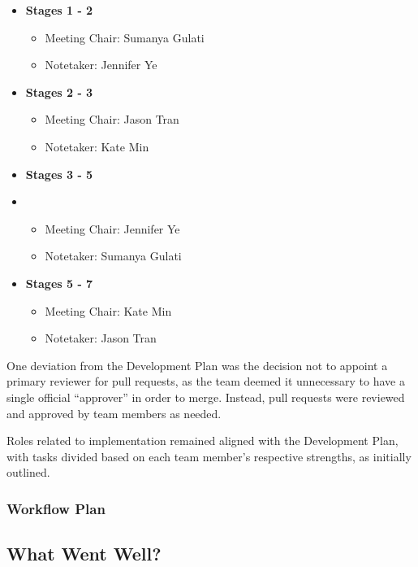 \documentclass{article}
\begin{document}
\begin{itemize}
    \item \textbf{Stages 1 - 2}
        \begin{itemize}
            \item Meeting Chair: Sumanya Gulati
            \item Notetaker: Jennifer Ye
        \end{itemize}
    \item \textbf{Stages 2 - 3}
        \begin{itemize}
            \item Meeting Chair: Jason Tran
            \item Notetaker: Kate Min
        \end{itemize}
    \item \textbf{Stages 3 - 5}
    \item \begin{itemize}
            \item Meeting Chair: Jennifer Ye
            \item Notetaker: Sumanya Gulati
        \end{itemize}
    \item \textbf{Stages 5 - 7}
        \begin{itemize}
            \item Meeting Chair: Kate Min
            \item Notetaker: Jason Tran
        \end{itemize}
\end{itemize}

One deviation from the Development Plan was the decision not to appoint a
primary reviewer for pull requests, as the team deemed it unnecessary to
have a single official ``approver'' in order to merge. Instead, pull requests
were reviewed and approved by team members as needed.

Roles related to implementation remained aligned with the Development Plan, with
tasks divided based on each team member’s respective strengths, as initially
outlined.

\subsubsection{Workflow Plan}

\subsection{What Went Well?}
\end{document}
